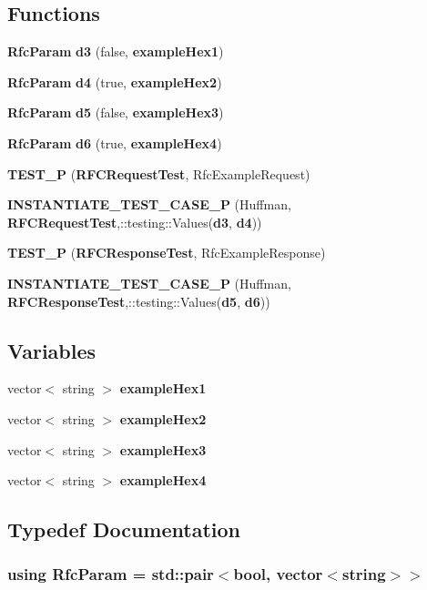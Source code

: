 \subsection*{Functions}
\begin{DoxyCompactItemize}
\item 
{\bf Rfc\+Param} {\bf d3} (false, {\bf example\+Hex1})
\item 
{\bf Rfc\+Param} {\bf d4} (true, {\bf example\+Hex2})
\item 
{\bf Rfc\+Param} {\bf d5} (false, {\bf example\+Hex3})
\item 
{\bf Rfc\+Param} {\bf d6} (true, {\bf example\+Hex4})
\item 
{\bf T\+E\+S\+T\+\_\+P} ({\bf R\+F\+C\+Request\+Test}, Rfc\+Example\+Request)
\item 
{\bf I\+N\+S\+T\+A\+N\+T\+I\+A\+T\+E\+\_\+\+T\+E\+S\+T\+\_\+\+C\+A\+S\+E\+\_\+P} (Huffman, {\bf R\+F\+C\+Request\+Test},\+::testing\+::\+Values({\bf d3}, {\bf d4}))
\item 
{\bf T\+E\+S\+T\+\_\+P} ({\bf R\+F\+C\+Response\+Test}, Rfc\+Example\+Response)
\item 
{\bf I\+N\+S\+T\+A\+N\+T\+I\+A\+T\+E\+\_\+\+T\+E\+S\+T\+\_\+\+C\+A\+S\+E\+\_\+P} (Huffman, {\bf R\+F\+C\+Response\+Test},\+::testing\+::\+Values({\bf d5}, {\bf d6}))
\end{DoxyCompactItemize}
\subsection*{Variables}
\begin{DoxyCompactItemize}
\item 
vector$<$ string $>$ {\bf example\+Hex1}
\item 
vector$<$ string $>$ {\bf example\+Hex2}
\item 
vector$<$ string $>$ {\bf example\+Hex3}
\item 
vector$<$ string $>$ {\bf example\+Hex4}
\end{DoxyCompactItemize}


\subsection{Typedef Documentation}
\subsubsection[{Rfc\+Param}]{\setlength{\rightskip}{0pt plus 5cm}using {\bf Rfc\+Param} =  std\+::pair$<$bool, vector$<$string$>$$>$}\label{RFCExamplesTests_8cpp_ad1c8ddb4f52c18b6e192c16cb18c25ee}


